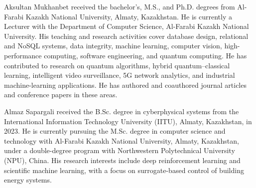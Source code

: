 \documentclass{ieeeaccess}
\begin{document}
%
%

\begin{IEEEbiographynophoto}{Aksultan Mukhanbet}
received the bachelor's, M.S., and Ph.D. degrees from Al-Farabi Kazakh National
University, Almaty, Kazakhstan. He is currently a Lecturer with the Department
of Computer Science, Al-Farabi Kazakh National University. His teaching and
research activities cover database design, relational and NoSQL systems, data
integrity, machine learning, computer vision, high-performance computing,
software engineering, and quantum computing. He has contributed to research on
quantum algorithms, hybrid quantum--classical learning, intelligent video
surveillance, 5G network analytics, and industrial machine-learning
applications. He has authored and coauthored journal articles and conference
papers in these areas.
\end{IEEEbiographynophoto}

\begin{IEEEbiographynophoto}{Almaz Sapargali}
received the B.Sc. degree in cyberphysical systems from the International
Information Technology University (IITU), Almaty, Kazakhstan, in 2023. He is
currently pursuing the M.Sc. degree in computer science and technology with
Al-Farabi Kazakh National University, Almaty, Kazakhstan, under a double-degree
program with Northwestern Polytechnical University (NPU), China. His research
interests include deep reinforcement learning and scientific machine learning,
with a focus on surrogate-based control of building energy systems.
\end{IEEEbiographynophoto}
\end{document}
